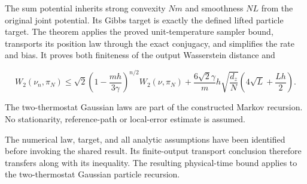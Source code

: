 \documentclass[11pt,a4paper]{report}
\begin{document}
The sum potential inherits strong convexity \(Nm\) and smoothness \(NL\) from the original joint potential. Its Gibbs target is exactly the defined lifted particle target. The theorem applies the proved unit-temperature sampler bound, transports its position law through the exact conjugacy, and simplifies the rate and bias. It proves both finiteness of the output Wasserstein distance and

\[W_2(\nu_n,\pi_N)\le\sqrt2\left(1-\frac{mh}{3\gamma}\right)^{n/2}W_2(\nu,\pi_N)+\frac{6\sqrt2\gamma}{m}h\sqrt{\frac{d_z}{N}}\left(4\sqrt L+\frac{Lh}{2}\right).\]

The two-thermostat Gaussian laws are part of the constructed Markov recursion. No stationarity, reference-path or local-error estimate is assumed.



The numerical law, target, and all analytic assumptions have been identified before invoking the shared result. Its finite-output transport conclusion therefore transfers along with its inequality. The resulting physical-time bound applies to the two-thermostat Gaussian particle recursion.
\end{document}
